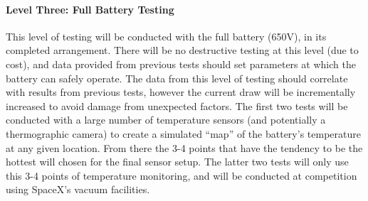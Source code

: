 \documentclass[main.tex]{subfile}
\begin{document}
    \paragraph{Level Three: Full Battery Testing}
    This level of testing will be conducted with the full battery (650V), in its completed arrangement. There will be no destructive testing at this level (due to cost), and data provided from previous tests should set parameters at which the battery can safely operate. The data from this level of testing should correlate with results from previous tests, however the current draw will be incrementally increased to avoid damage from unexpected factors. The first two tests will be conducted with a large number of temperature sensors (and potentially a thermographic camera) to create a simulated “map” of the battery’s temperature at any given location. From there the 3-4 points that have the tendency to be the hottest will chosen for the final sensor setup. The latter two tests will only use this 3-4 points of temperature monitoring, and will be conducted at competition using SpaceX’s vacuum facilities.
\end{document}

